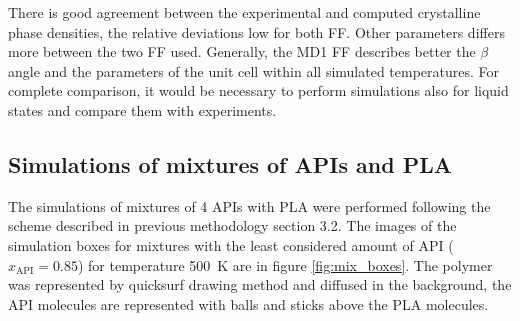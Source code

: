 \newpage
There is good agreement between the experimental and computed crystalline phase densities, the relative deviations low for both FF. Other parameters differs more between the two FF used. Generally, the MD1 FF describes better the $\beta$ angle and the parameters of the unit cell within all simulated temperatures. For complete comparison, it would be necessary to perform simulations also for liquid states and compare them with experiments.

\vspace{-0.2cm}
\subsection{Simulations of mixtures of APIs and PLA}
The simulations of mixtures of 4 APIs with PLA were performed following the scheme described in previous methodology section 3.2. The images of the simulation boxes for mixtures with the least considered amount of API ($x_{\text{API}}=0.85$) for temperature 500~K are in figure \ref{fig:mix_boxes}. The polymer was represented by quicksurf drawing method and diffused in the background, the API molecules are represented with balls and sticks above the PLA molecules.

